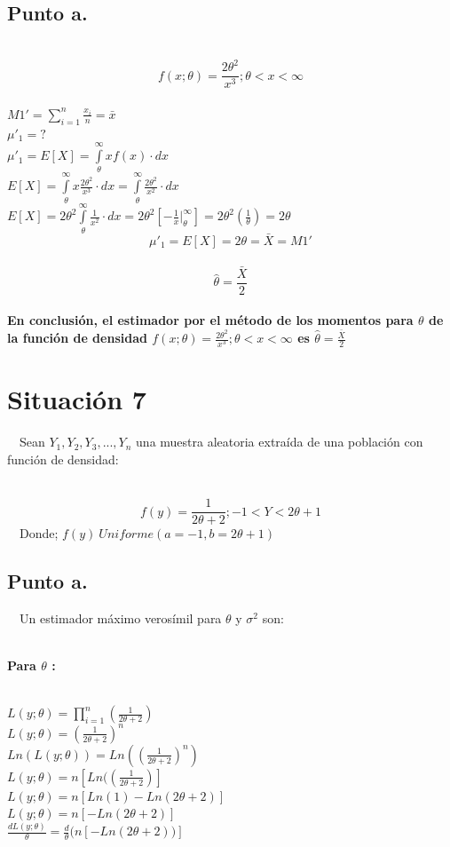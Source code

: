 \documentclass[letterpaper,12pt,onecolumn,titlepage]{article}
\begin{document}
\subsection{Punto a.}
~\\ $$f(x;\theta) = \frac{2\theta^2}{x^3} ; \theta<x<\infty $$
~\\ $M1'=\sum_{i=1}^{n}\frac{x_{i}}{n}=\bar{x}$
~\\ $\mu'_1 =?$
~\\ $\mu'_1=E[X]= \int \limits_{\theta}^{\infty} x f(x) \cdot dx$
~\\ $E[X]=\int \limits_{\theta}^{\infty} x \frac{2\theta^2}{x^3}\cdot dx=\int \limits_{\theta}^{\infty}\frac{2\theta^2}{x^2}\cdot dx$
~\\ $E[X]=2\theta^2 \int \limits_{\theta}^{\infty}\frac{1}{x^2}\cdot dx= 2\theta^2[-\frac{1}{x}|_{\theta}^{\infty}]=2\theta^2(\frac{1}{\theta})=2\theta$
~\\ $$\mu'_1=E[X]=2\theta=\bar{X}=M1'$$
~\ $$\hat{\theta}=\frac{\bar{X}}{2}$$
~\\ \textbf{En conclusi\'{o}n, el estimador por el m\'{e}todo de los momentos para $\theta$ de la funci\'{o}n de densidad $f(x;\theta) = \frac{2\theta^2}{x^3} ; \theta<x<\infty $ es $\hat{\theta}=\frac{\bar{X}}{2}$}


\pagebreak\section{Situaci\'{o}n 7}
~\ Sean $Y_{1}, Y_{2}, Y_{3},...,Y_{n}$ una muestra aleatoria extra\'{i}da de una poblaci\'{o}n con funci\'{o}n de densidad:

~\ $$f({y})= \frac{1}{2\theta +2}  ;  -1<Y<2\theta+1$$
~\ Donde; $f({y}) ~ Uniforme(a=-1,b=2\theta+1)$

\subsection{Punto a.}
~\ Un estimador m\'{a}ximo veros\'{i}mil para $\theta$ y $\sigma^{2}$ son:

~\\ \textbf{Para $\theta$ :}

~\\ $L(y;\theta) = \prod_{i=1}^n{}(\frac{1}{2\theta +2})$
~\\ $L(y;\theta) = (\frac{1}{2\theta +2})^{n}$
~\\ $Ln(L(y;\theta)) = Ln((\frac{1}{2\theta +2})^{n})$
~\\ $L(y;\theta) = n[Ln((\frac{1}{2\theta +2})]$
~\\ $L(y;\theta) = n[Ln(1)-Ln({2\theta+2})]$
~\\ $L(y;\theta) = n[-Ln({2\theta+2})]$
~\\ $\frac{dL(y;\theta)}{\theta} = \frac{d}{\theta}(n[-Ln({2\theta+2}))]$
\end{document}
